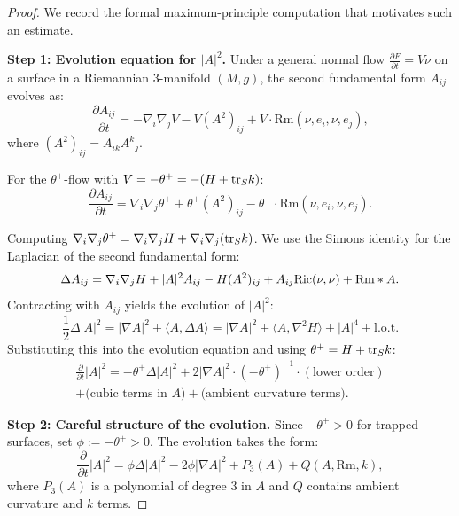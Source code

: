 \begin{proof}
We record the formal maximum-principle computation that motivates such an estimate.

\textbf{Step 1: Evolution equation for $|A|^2$.}
Under a general normal flow $\frac{\partial F}{\partial t} = V\nu$ on a surface in a Riemannian 3-manifold $(M,g)$, the second fundamental form $A_{ij}$ evolves as:
\begin{equation}
    \frac{\partial A_{ij}}{\partial t} = -\nabla_i\nabla_j V - V(A^2)_{ij} + V \cdot \mathrm{Rm}(\nu, e_i, \nu, e_j),
\end{equation}
where $(A^2)_{ij} = A_{ik}A^k{}_j$.

For the $\theta^+$-flow with $V = -\theta^+ = -(H + \mathrm{tr}_S k)$:
\begin{equation}
    \frac{\partial A_{ij}}{\partial t} = \nabla_i\nabla_j \theta^+ + \theta^+ (A^2)_{ij} - \theta^+ \cdot \mathrm{Rm}(\nu, e_i, \nu, e_j).
\end{equation}

Computing $\nabla_i\nabla_j \theta^+ = \nabla_i\nabla_j H + \nabla_i\nabla_j(\mathrm{tr}_S k)$. We use the Simons identity for the Laplacian of the second fundamental form:
\begin{equation}
    \Delta A_{ij} = \nabla_i \nabla_j H + |A|^2 A_{ij} - H (A^2)_{ij} + A_{ij} \mathrm{Ric}(\nu, \nu) + \text{Rm} * A.
\end{equation}
Contracting with $A_{ij}$ yields the evolution of $|A|^2$:
\begin{equation}
    \frac{1}{2} \Delta |A|^2 = |\nabla A|^2 + \langle A, \Delta A \rangle = |\nabla A|^2 + \langle A, \nabla^2 H \rangle + |A|^4 + \text{l.o.t.}
\end{equation}
Substituting this into the evolution equation and using $\theta^+ = H + \mathrm{tr}_S k$:
\begin{multline}
    \frac{\partial}{\partial t}|A|^2 = -\theta^+ \Delta |A|^2 + 2|\nabla A|^2 \cdot (-\theta^+)^{-1} \cdot (\text{lower order}) \\
    + \text{(cubic terms in } A) + \text{(ambient curvature terms)}.
\end{multline}

\textbf{Step 2: Careful structure of the evolution.}
Since $-\theta^+ > 0$ for trapped surfaces, set $\phi := -\theta^+ > 0$. The evolution takes the form:
\begin{equation}\label{eq:Aevolution}
    \frac{\partial}{\partial t}|A|^2 = \phi \Delta |A|^2 - 2\phi |\nabla A|^2 + P_3(A) + Q(A, \mathrm{Rm}, k),
\end{equation}
where $P_3(A)$ is a polynomial of degree 3 in $A$ and $Q$ contains ambient curvature and $k$ terms.


\end{proof}

